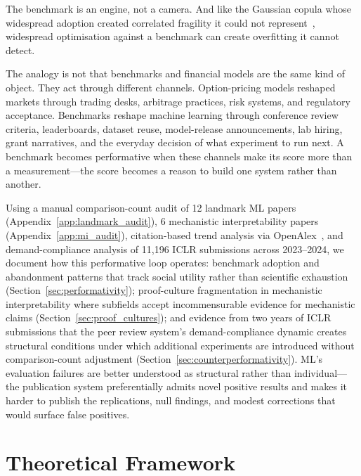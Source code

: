 \documentclass{article}
\begin{document}
The benchmark is an engine, not a camera. And like the Gaussian copula whose widespread adoption created correlated fragility it could not represent~\citep{mackenzie_bamford_2018}, widespread optimisation against a benchmark can create overfitting it cannot detect.

The analogy is not that benchmarks and financial models are the same kind of object. They act through different channels. Option-pricing models reshaped markets through trading desks, arbitrage practices, risk systems, and regulatory acceptance. Benchmarks reshape machine learning through conference review criteria, leaderboards, dataset reuse, model-release announcements, lab hiring, grant narratives, and the everyday decision of what experiment to run next. A benchmark becomes performative when these channels make its score more than a measurement---the score becomes a reason to build one system rather than another.

Using a manual comparison-count audit of 12 landmark ML papers (Appendix~\ref{app:landmark_audit}), 6 mechanistic interpretability papers (Appendix~\ref{app:mi_audit}), citation-based trend analysis via OpenAlex~\citep{priem_openalex_2022}, and demand-compliance analysis of 11,196 ICLR submissions across 2023--2024, we document how this performative loop operates: benchmark adoption and abandonment patterns that track social utility rather than scientific exhaustion (Section~\ref{sec:performativity}); proof-culture fragmentation in mechanistic interpretability where subfields accept incommensurable evidence for mechanistic claims (Section~\ref{sec:proof_cultures}); and evidence from two years of ICLR submissions that the peer review system's demand-compliance dynamic creates structural conditions under which additional experiments are introduced without comparison-count adjustment (Section~\ref{sec:counterperformativity}). ML's evaluation failures are better understood as structural rather than individual---the publication system preferentially admits novel positive results and makes it harder to publish the replications, null findings, and modest corrections that would surface false positives.


\section{Theoretical Framework}
\label{sec:theory}
\end{document}
